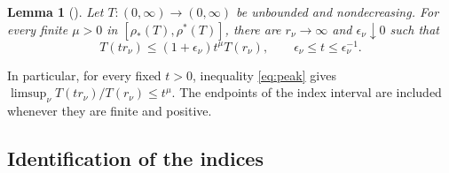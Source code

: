 \documentclass[11pt,letterpaper,reqno]{amsart}
\newtheorem{lem}[thm]{Lemma}
\theoremstyle{remark}
\numberwithin{equation}{section}
\begin{document}
\begin{lem}[{\cite[p.~1203]{Ere93}}]\label{lem:peaks}
Let $T\colon(0,\infty)\to(0,\infty)$ be unbounded and nondecreasing.
For every finite
$\mu>0$ in $[\rho_*(T),\rho^*(T)]$, there are $r_\nu\to\infty$ and
$\epsilon_\nu\downarrow0$ such that
\begin{equation}\label{eq:peak}
 T(tr_\nu)\le(1+\epsilon_\nu)t^\mu T(r_\nu),
 \qquad \epsilon_\nu\le t\le\epsilon_\nu^{-1}.
\end{equation}
\end{lem}

In particular, for every fixed $t>0$, inequality \eqref{eq:peak} gives
$\limsup_\nu T(tr_\nu)/T(r_\nu)\le t^\mu$. The endpoints of the index
interval are included whenever they are finite and positive.

\subsection{Identification of the indices}
\end{document}
